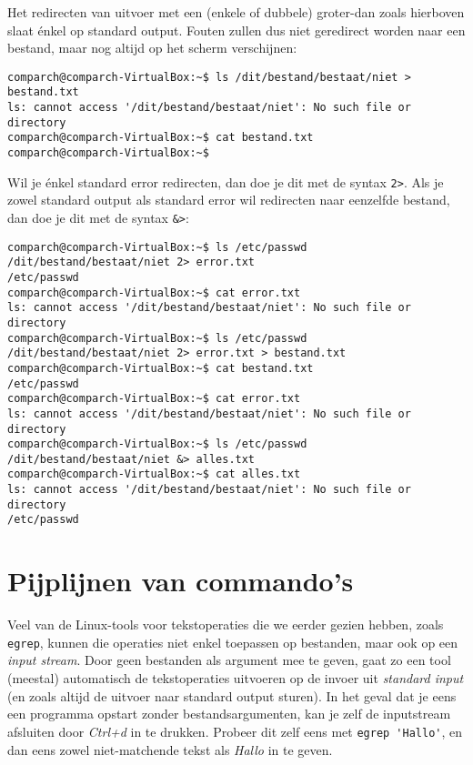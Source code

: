 \documentclass[a4paper,twoside,openany]{memoir}
\begin{document}
Het redirecten van uitvoer met een (enkele of dubbele) groter-dan zoals
hierboven slaat énkel op standard output. Fouten zullen dus niet geredirect
worden naar een bestand, maar nog altijd op het scherm verschijnen:

\begin{verbatim}
comparch@comparch-VirtualBox:~$ ls /dit/bestand/bestaat/niet > bestand.txt
ls: cannot access '/dit/bestand/bestaat/niet': No such file or directory
comparch@comparch-VirtualBox:~$ cat bestand.txt
comparch@comparch-VirtualBox:~$
\end{verbatim}

Wil je énkel standard error redirecten, dan doe je dit met de syntax \verb!2>!.
Als je zowel standard output als standard error wil redirecten naar eenzelfde
bestand, dan doe je dit met de syntax \verb!&>!:

\begin{verbatim}
comparch@comparch-VirtualBox:~$ ls /etc/passwd /dit/bestand/bestaat/niet 2> error.txt
/etc/passwd
comparch@comparch-VirtualBox:~$ cat error.txt
ls: cannot access '/dit/bestand/bestaat/niet': No such file or directory
comparch@comparch-VirtualBox:~$ ls /etc/passwd /dit/bestand/bestaat/niet 2> error.txt > bestand.txt
comparch@comparch-VirtualBox:~$ cat bestand.txt
/etc/passwd
comparch@comparch-VirtualBox:~$ cat error.txt
ls: cannot access '/dit/bestand/bestaat/niet': No such file or directory
comparch@comparch-VirtualBox:~$ ls /etc/passwd /dit/bestand/bestaat/niet &> alles.txt
comparch@comparch-VirtualBox:~$ cat alles.txt
ls: cannot access '/dit/bestand/bestaat/niet': No such file or directory
/etc/passwd
\end{verbatim}

\chapter{Pijplijnen van commando's}

Veel van de Linux-tools voor tekstoperaties die we eerder gezien hebben, zoals
\verb!egrep!, kunnen die operaties niet enkel toepassen op bestanden, maar ook
op een \emph{input stream}. Door geen bestanden als argument mee te geven, gaat
zo een tool (meestal) automatisch de tekstoperaties uitvoeren op de invoer uit
\emph{standard input} (en zoals altijd de uitvoer naar standard output sturen).
In het geval dat je eens een programma opstart zonder bestandsargumenten, kan je
zelf de inputstream afsluiten door \emph{Ctrl+d} in te drukken. Probeer dit zelf
eens met \verb!egrep 'Hallo'!, en dan eens zowel niet-matchende tekst als
\emph{Hallo} in te geven.
\end{document}
